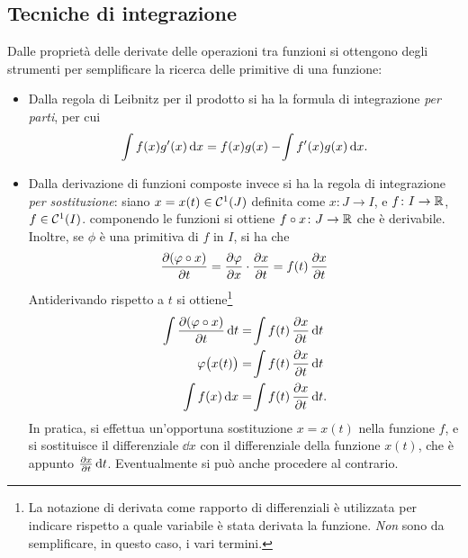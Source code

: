 \subsection*{Tecniche di integrazione}
Dalle proprietà delle derivate delle operazioni tra funzioni si ottengono degli strumenti per semplificare la ricerca delle primitive di una funzione:
\begin{itemize}
\item Dalla regola di Leibnitz per il prodotto si ha la formula di integrazione \emph{per parti}, per cui
\[
\int f(x)g'(x)\,\textup{d} x=f(x)g(x)-\!\int f'(x)g(x)\,\textup{d} x.
\]
\item Dalla derivazione di funzioni composte invece si ha la regola di integrazione \emph{per sostituzione}: siano $x=x(t)\in\mathcal{C}^{{1}}(J)$ definita come $x\colon J\to I$, e $f\colon I\to\mathbb{R}$, $f\in\mathcal{C}^{{1}}(I)$. componendo le funzioni si ottiene $f\circ x\colon J\to\mathbb{R}$ che è derivabile. Inoltre, se $\phi$ è una primitiva di $f$ in $I$, si ha che
\[
\frac{\partial {(\varphi\circ x)}}{\partial {t}}=\frac{\partial {\varphi}}{\partial {x}}\cdot\frac{\partial {x}}{\partial {t}}=f(t)\,\frac{\partial {x}}{\partial {t}}
\]
Antiderivando rispetto a $t$ si ottiene\footnote{La notazione di derivata come rapporto di differenziali è utilizzata per indicare rispetto a quale variabile è stata derivata la funzione. \emph{Non} sono da semplificare, in questo caso, i vari termini.}
\begin{align*}
\int\frac{\partial {(\varphi\circ x)}}{\partial {t}}\,\textup{d} t&=\!\int f(t)\,\frac{\partial {x}}{\partial {t}}\,\textup{d} t\\
\varphi\big(x(t)\big)&=\!\int f(t)\,\frac{\partial {x}}{\partial {t}}\,\textup{d} t\\
\int f(x)\,\textup{d} x&=\!\int f(t)\,\frac{\partial {x}}{\partial {t}}\,\textup{d} t.
\end{align*}
In pratica, si effettua un'opportuna sostituzione $x=x(t)$ nella funzione $f$, e si sostituisce il differenziale $\dd x$ con il differenziale della funzione $x(t)$, che è appunto $\frac{\partial {x}}{\partial {t}}\,\textup{d} t$. Eventualmente si può anche procedere al contrario.
\end{itemize}

